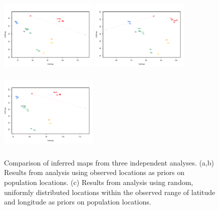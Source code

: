 \documentclass[12pt]{article}
\newcommand{\gc}[1]{{\em \color{blue} #1}}
\begin{document}

\begin{figure}
	\centering
		\subcaptionbox{\label{warb_pop_realpr1}}
			{\includegraphics[width=1.85in,height=1.54in]{figs/warblers/population_warbler_map_realpr1.png}}
		\subcaptionbox{\label{warb_pop_realpr2}}			
			{\includegraphics[width=1.85in,height=1.54in]{figs/warblers/population_warbler_map_realpr2.png}}
		\subcaptionbox{\label{warb_pop_randpr1}}
			{\includegraphics[width=1.85in,height=1.54in]{figs/warblers/population_warbler_map_randpr1.png}}
	\caption{Comparison of inferred maps from three independent analyses.  (a,b) Results from analysis using observed locations as priors on population locations.  (c) Results from analysis using random, uniformly distributed locations within the observed range of latitude and longitude as priors on population locations.}\label{sfig:warbler_pop_compare}
\end{figure}
\end{document}
